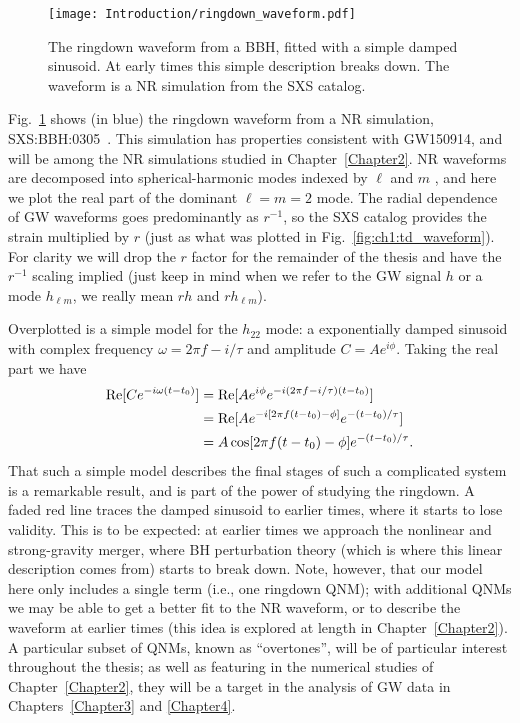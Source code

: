 \begin{figure}[ht!]
	\centering
	\texttt{[image: Introduction/ringdown\_waveform.pdf]}
	\caption[The gravitational-wave ringdown signal]{ 
		The ringdown waveform from a BBH, fitted with a simple damped sinusoid. At early times this simple description breaks down. The waveform is a NR simulation from the SXS catalog.}
	\label{fig:ch1:rd_waveform}
\end{figure}

Fig.~\ref{fig:ch1:rd_waveform} shows (in blue) the ringdown waveform from a NR simulation, SXS:BBH:0305~\cite{Lovelace:2016uwp}.
This simulation has properties consistent with GW150914, and will be among the NR simulations studied in Chapter~\ref{Chapter2}.
NR waveforms are decomposed into spherical-harmonic modes indexed by $\ell$ and $m$ , and here we plot the real part of the dominant $\ell = m = 2$ mode.
The radial dependence of GW waveforms goes predominantly as $r^{-1}$, so the SXS catalog provides the strain multiplied by $r$ (just as what was plotted in Fig.~\ref{fig:ch1:td_waveform}).
For clarity we will drop the $r$ factor for the remainder of the thesis and have the $r^{-1}$ scaling implied (just keep in mind when we refer to the GW signal $h$ or a mode $h_{\ell m}$, we really mean $rh$ and $rh_{\ell m}$). 

Overplotted is a simple model for the $h_{22}$ mode: a exponentially damped sinusoid with complex frequency $\omega = 2\pi f - i/\tau$ and amplitude $C = Ae^{i\phi}$. 
Taking the real part we have
\begin{align}
    \Re[Ce^{-i\omega(t-t_0)}] &= \Re[Ae^{i\phi}e^{-i(2\pi f - i/\tau)(t-t_0)}] \nonumber \\
    &= \Re[Ae^{-i\qty[2\pi f(t-t_0) - \phi]}e^{-(t-t_0)/\tau}] \nonumber \\
    &= A\cos[2\pi f(t-t_0) - \phi]e^{-(t-t_0)/\tau}.
\end{align}
That such a simple model describes the final stages of such a complicated system is a remarkable result, and is part of the power of studying the ringdown.
A faded red line traces the damped sinusoid to earlier times, where it starts to lose validity.
This is to be expected: at earlier times we approach the nonlinear and strong-gravity merger, where BH perturbation theory (which is where this linear description comes from) starts to break down.
Note, however, that our model here only includes a single term (i.e., one ringdown QNM); with additional QNMs we may be able to get a better fit to the NR waveform, or to describe the waveform at earlier times (this idea is explored at length in Chapter~\ref{Chapter2}).
A particular subset of QNMs, known as ``overtones'', will be of particular interest throughout the thesis; as well as featuring in the numerical studies of Chapter~\ref{Chapter2}, they will be a target in the analysis of GW data in Chapters~\ref{Chapter3} and \ref{Chapter4}.

